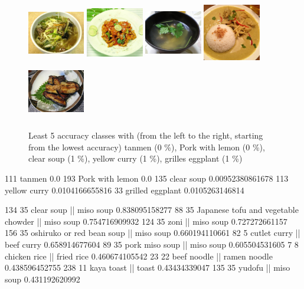 \begin{figure}
    \centering
    \includegraphics[height=2.5cm, width=2.5cm]{img/least_tanmen.jpg}
    \includegraphics[height=2.5cm, width=2.5cm]{img/least_pork_with_lemon.jpg}
    \includegraphics[height=2.5cm, width=2.5cm]{img/least_clear_soup.jpg}
    \includegraphics[height=2.5cm, width=2.5cm]{img/least_yellow_curry.jpg}
    \includegraphics[height=2.5cm, width=2.5cm]{img/least_grilled_eggplant.jpg}
    \caption[Least 5 accuracy classes]{Least 5 accuracy classes with (from the left to the right, starting from the lowest accuracy) tanmen (0 \%), Pork with lemon (0 \%), clear soup (1 \%), yellow curry (1 \%), grilles eggplant (1 \%)}
    \label{fig:least_5}
\end{figure}

111 tanmen 0.0
193 Pork with lemon 0.0
135 clear soup 0.00952380861678
113 yellow curry 0.0104166655816
33 grilled eggplant 0.0105263146814

134 35 clear soup || miso soup 0.838095158277
88 35 Japanese tofu and vegetable chowder || miso soup 0.754716909932
124 35 zoni || miso soup 0.727272661157
156 35 oshiruko or red bean soup || miso soup 0.660194110661
82 5 cutlet curry || beef curry 0.658914677604
89 35 pork miso soup || miso soup 0.605504531605
7 8 chicken rice || fried rice 0.460674105542
23 22 beef noodle || ramen noodle 0.438596452755
238 11 kaya toast || toast 0.43434339047
135 35 yudofu || miso soup 0.431192620992


